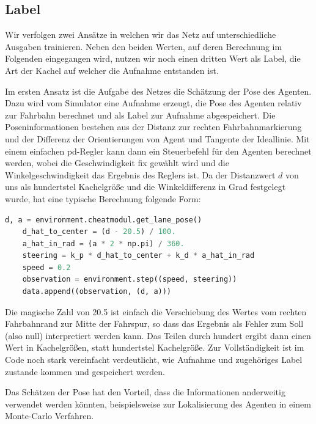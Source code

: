 \subsection{Label}

Wir verfolgen zwei Ansätze in welchen wir das Netz auf unterschiedliche Ausgaben trainieren. Neben den beiden Werten, auf deren Berechnung im Folgenden eingegangen wird, nutzen wir noch einen dritten Wert als Label, die Art der Kachel auf welcher die Aufnahme entstanden ist.

Im ersten Ansatz ist die Aufgabe des Netzes die Schätzung der Pose des Agenten. Dazu wird vom Simulator eine Aufnahme erzeugt, die Pose des Agenten relativ zur Fahrbahn berechnet und als Label zur Aufnahme abgespeichert. Die Poseninformationen bestehen aus der Distanz zur rechten Fahrbahnmarkierung und der Differenz der Orientierungen von Agent und Tangente der Ideallinie. Mit einem einfachen \acs{pd}-Regler kann dann ein Steuerbefehl für den Agenten berechnet werden, wobei die Geschwindigkeit fix gewählt wird und die Winkelgeschwindigkeit das Ergebnis des Reglers ist. Da der Distanzwert $d$ von uns als hundertstel Kachelgröße und die Winkeldifferenz in Grad festgelegt wurde, hat eine typische Berechnung folgende Form:\\

\begin{minipage}{\linewidth}
	\begin{lstlisting}[caption={Berechnung eines Steuerbefehls mit \acs{pd}-Regler}, language=python]
	d, a = environment.cheatmodul.get_lane_pose()
	d_hat_to_center = (d - 20.5) / 100.
	a_hat_in_rad = (a * 2 * np.pi) / 360.
	steering = k_p * d_hat_to_center + k_d * a_hat_in_rad
	speed = 0.2
	observation = environment.step((speed, steering))
	data.append((observation, (d, a)))
	\end{lstlisting}
\end{minipage}

\vspace{.5cm}
Die magische Zahl von 20.5 ist einfach die Verschiebung des Wertes vom rechten Fahrbahnrand zur Mitte der Fahrspur, so dass das Ergebnis als Fehler zum Soll (also null) interpretiert werden kann. Das Teilen durch hundert ergibt dann einen Wert in Kachelgrößen, statt hundertstel Kachelgröße.
Zur Vollständigkeit ist im Code noch stark vereinfacht verdeutlicht, wie Aufnahme und zugehöriges Label zustande kommen und gespeichert werden.

Das Schätzen der Pose hat den Vorteil, dass die Informationen anderweitig verwendet werden könnten, beispielsweise zur Lokalisierung des Agenten in einem Monte-Carlo Verfahren.\\

